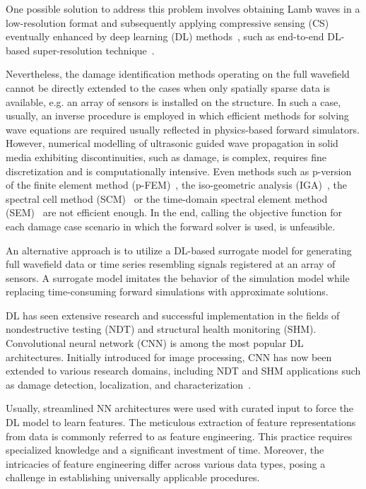 One possible solution to address this problem involves obtaining Lamb waves in a low-resolution format and subsequently applying compressive sensing (CS) eventually enhanced by deep learning (DL) methods~\cite{esfandabadideep}, such as end-to-end DL-based super-resolution technique~\cite{ijjeh2023deep}. 

Nevertheless, the damage identification methods operating on the full wavefield cannot be directly extended to the cases when only spatially sparse data is available, e.g. an array of sensors is installed on the structure.
In such a case, usually, an inverse procedure is employed in which efficient 
methods for solving wave equations are required usually reflected in physics-based forward simulators.  
However, numerical modelling of ultrasonic guided wave propagation in solid media exhibiting discontinuities, such as damage, is complex, requires fine discretization and is computationally intensive.
Even methods such as p-version of the finite element method (p-FEM)~\cite{Duczek2013}, the iso-geometric analysis (IGA)~\cite{Anitescu2019}, the spectral cell method (SCM)~\cite{Mossaiby2019} or the time-domain spectral element method (SEM)~\cite{Ostachowicz2012} are not efficient enough.
In the end, calling the objective function for each damage case scenario in which the forward solver is used, is unfeasible.

An alternative approach is to utilize a DL-based surrogate model for generating full wavefield data or time series resembling signals registered at an array of sensors. 
A surrogate model imitates the behavior of the simulation model while replacing time-consuming forward simulations with approximate solutions.

DL has seen extensive research and successful implementation in the fields of nondestructive testing (NDT) and structural health monitoring (SHM). 
Convolutional neural network (CNN) is among the most popular DL architectures. 
Initially introduced for image processing, CNN has now been extended to various research domains, including NDT and SHM applications such as damage detection, localization, and characterization~\cite{rautela2019deep, pandey2022explainable, ijjeh2021full, ijjeh2022deep}.

Usually, streamlined NN architectures were used with curated input to force the DL model to learn features. 
The meticulous extraction of feature representations from data is commonly referred to as feature engineering. 
This practice requires specialized knowledge and a significant investment of time. 
Moreover, the intricacies of feature engineering differ across various data types, posing a challenge in establishing universally applicable procedures.

